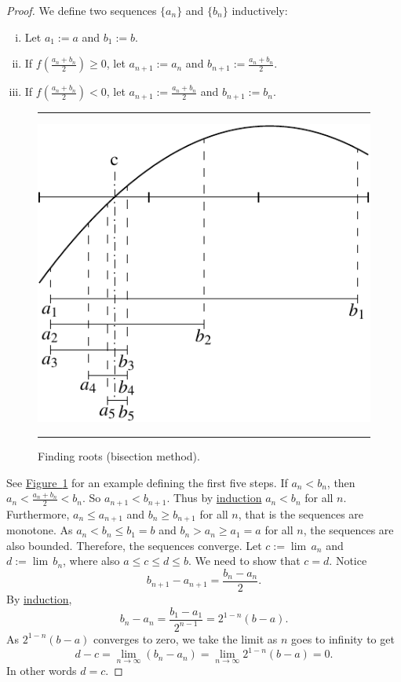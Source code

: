 \documentclass[12pt]{book}
\newenvironment{myfigureht}{%
\begin{figure}[h!t]
\noindent\rule{\textwidth}{0.4pt}\vspace{12pt}\par\centering}%
{\par\noindent\rule{\textwidth}{0.4pt}
\end{figure}}
\theoremstyle{plain}
\theoremstyle{remark}
\theoremstyle{definition}
\theoremstyle{exercise}
\theoremstyle{example}
\newcommand{\figureref}[1]{\hyperref[#1]{Figure~\ref*{#1}}}
\begin{document}
\begin{proof}
We define two sequences $\{ a_n \}$
and $\{ b_n \}$ inductively:
\begin{enumerate}[(i)]
\item Let $a_1 := a$ and $b_1 := b$.
\item If $f\left(\frac{a_n+b_n}{2}\right) \geq 0$, let $a_{n+1} := a_n$ and
$b_{n+1} := \frac{a_n+b_n}{2}$.
\item If $f\left(\frac{a_n+b_n}{2}\right) < 0$, let $a_{n+1} := \frac{a_n+b_n}{2}$ and
$b_{n+1} := b_n$.
\end{enumerate}
\begin{myfigureht}
\includegraphics{figures/bisect}
\caption{Finding roots (bisection method).\label{bisectfig}}
\end{myfigureht}
See \figureref{bisectfig} for an example defining the first five steps.
If $a_n < b_n$, then $a_n < \frac{a_n+b_n}{2} < b_n$.  So
$a_{n+1} < b_{n+1}$.
Thus by \hyperref[induction:thm]{induction} $a_n < b_n$ for all $n$.
Furthermore, $a_n \leq a_{n+1}$ and 
$b_n \geq b_{n+1}$ for all $n$, that is the sequences are monotone.
As $a_n < b_n \leq b_1 = b$ and 
$b_n > a_n \geq a_1 = a$ for all $n$,
the sequences are also bounded.  Therefore, the
sequences converge.  Let $c := \lim\, a_n$ and $d := \lim\, b_n$,
where also $a \leq c \leq d \leq b$.  We need
to show that $c=d$.
Notice
\begin{equation*}
b_{n+1} - a_{n+1} = \frac{b_n-a_n}{2}.
\end{equation*}
By \hyperref[induction:thm]{induction},
\begin{equation*}
b_n - a_n = \frac{b_1-a_1}{2^{n-1}} = 2^{1-n} (b-a) .
\end{equation*}
As $2^{1-n}(b-a)$ converges to zero, we take the limit as $n$ goes to
infinity to get
\begin{equation*}
d-c = \lim_{n\to\infty} (b_n - a_n) =
\lim_{n\to\infty} 2^{1-n} (b-a) = 0.
\end{equation*}
In other words $d=c$.


\end{proof}
\end{document}
